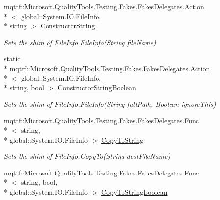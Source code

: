 \begin{DoxyCompactItemize}
mqttf\-::\-Microsoft.\-Quality\-Tools.\-Testing.\-Fakes.\-Fakes\-Delegates.\-Action\\*
$<$ global\-::\-System.\-I\-O.\-File\-Info, \\*
string $>$ \hyperlink{class_system_1_1_i_o_1_1_fakes_1_1_shim_file_info_a8ac843a6c7e1351c9f96cb581d63be73}{Constructor\-String}
\begin{DoxyCompactList}\small\item\em Sets the shim of File\-Info.\-File\-Info(\-String file\-Name)\end{DoxyCompactList}\item 
static \\*
mqttf\-::\-Microsoft.\-Quality\-Tools.\-Testing.\-Fakes.\-Fakes\-Delegates.\-Action\\*
$<$ global\-::\-System.\-I\-O.\-File\-Info, \\*
string, bool $>$ \hyperlink{class_system_1_1_i_o_1_1_fakes_1_1_shim_file_info_abed68548929c4307685f6ec1f94b0878}{Constructor\-String\-Boolean}
\begin{DoxyCompactList}\small\item\em Sets the shim of File\-Info.\-File\-Info(\-String full\-Path, Boolean ignore\-This)\end{DoxyCompactList}\item 
mqttf\-::\-Microsoft.\-Quality\-Tools.\-Testing.\-Fakes.\-Fakes\-Delegates.\-Func\\*
$<$ string, \\*
global\-::\-System.\-I\-O.\-File\-Info $>$ \hyperlink{class_system_1_1_i_o_1_1_fakes_1_1_shim_file_info_aa8ca4876aae5bd005c5fee2badc4c0c2}{Copy\-To\-String}
\begin{DoxyCompactList}\small\item\em Sets the shim of File\-Info.\-Copy\-To(\-String dest\-File\-Name)\end{DoxyCompactList}\item 
mqttf\-::\-Microsoft.\-Quality\-Tools.\-Testing.\-Fakes.\-Fakes\-Delegates.\-Func\\*
$<$ string, bool, \\*
global\-::\-System.\-I\-O.\-File\-Info $>$ \hyperlink{class_system_1_1_i_o_1_1_fakes_1_1_shim_file_info_a2ee41eff7a51bfa3c37e16bd53269788}{Copy\-To\-String\-Boolean}

\end{DoxyCompactItemize}
